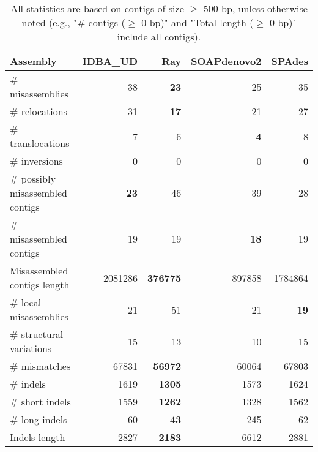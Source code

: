 \documentclass[12pt,a4paper]{article}
\begin{document}
\begin{table}[ht]
\begin{center}
\caption{All statistics are based on contigs of size $\geq$ 500 bp, unless otherwise noted (e.g., "\# contigs ($\geq$ 0 bp)" and "Total length ($\geq$ 0 bp)" include all contigs).}
\begin{tabular}{|l*{4}{|r}|}
\hline
Assembly & IDBA\_UD & Ray & SOAPdenovo2 & SPAdes \\ \hline
\# misassemblies & 38 & {\bf 23} & 25 & 35 \\ \hline
\hspace{5mm}\# relocations & 31 & {\bf 17} & 21 & 27 \\ \hline
\hspace{5mm}\# translocations & 7 & 6 & {\bf 4} & 8 \\ \hline
\hspace{5mm}\# inversions & 0 & 0 & 0 & 0 \\ \hline
\# possibly misassembled contigs & {\bf 23} & 46 & 39 & 28 \\ \hline
\# misassembled contigs & 19 & 19 & {\bf 18} & 19 \\ \hline
Misassembled contigs length & 2081286 & {\bf 376775} & 897858 & 1784864 \\ \hline
\# local misassemblies & 21 & 51 & 21 & {\bf 19} \\ \hline
\# structural variations & 15 & 13 & 10 & 15 \\ \hline
\# mismatches & 67831 & {\bf 56972} & 60064 & 67803 \\ \hline
\# indels & 1619 & {\bf 1305} & 1573 & 1624 \\ \hline
\hspace{5mm}\# short indels & 1559 & {\bf 1262} & 1328 & 1562 \\ \hline
\hspace{5mm}\# long indels & 60 & {\bf 43} & 245 & 62 \\ \hline
Indels length & 2827 & {\bf 2183} & 6612 & 2881 \\ \hline
\end{tabular}
\end{center}
\end{table}
\end{document}
